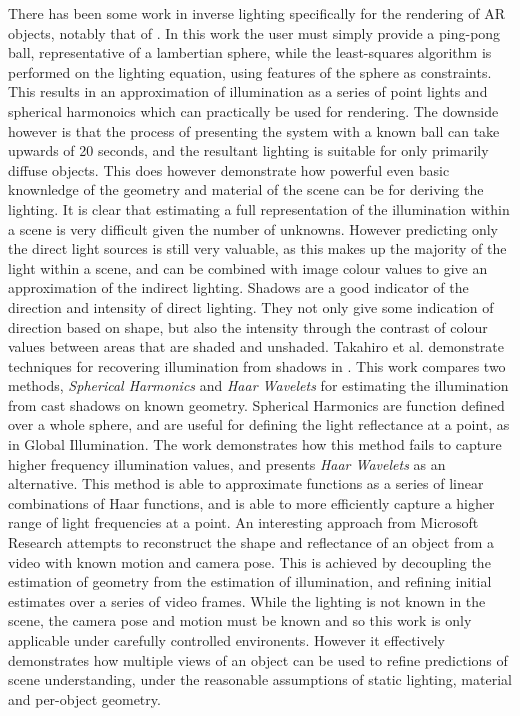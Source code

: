 \documentclass[ %
                    author={Gavin Parker},
                supervisor={Dr. Neill Campbell},
                    degree={MEng},
                     title={Deep Siamese Networks for Illumination Estimation from Stereo Images},
                  subtitle={},
                      type={research},
                      year={2018} ]{dissertation}
\begin{document}
\newline
There has been some work in inverse lighting specifically for the rendering of AR objects, notably that of \cite{Aittala2010}. In this work the user must simply provide a ping-pong ball, representative of a lambertian sphere, while the least-squares algorithm is performed on the lighting equation, using features of the sphere as constraints. This results in an approximation of illumination as a series of point lights and spherical harmonoics which can practically be used for rendering. The downside however is that the process of presenting the system with a known ball can take upwards of 20 seconds, and the resultant lighting is suitable for only primarily diffuse objects. This does however demonstrate how powerful even basic knownledge of the geometry and material of the scene can be for deriving the lighting.
\newline
It is clear that estimating a full representation of the illumination within a scene is very difficult given the number of unknowns. However predicting only the direct light sources is still very valuable, as this makes up the majority of the light within a scene, and can be combined with image colour values to give an approximation of the indirect lighting. Shadows are a good indicator of the direction and intensity of direct lighting. They not only give some indication of direction based on shape, but also the intensity through the contrast of colour values between areas that are shaded and unshaded. Takahiro et al. demonstrate techniques for recovering illumination from shadows in \cite{1315013}. This work compares two methods, \textit{Spherical Harmonics} and \textit{Haar Wavelets} for estimating the illumination from cast shadows on known geometry. Spherical Harmonics are function defined over a whole sphere, and are useful for defining the light reflectance at a point, as in Global Illumination. The work demonstrates how this method fails to capture higher frequency illumination values, and presents \textit{Haar Wavelets} as an alternative. This method is able to approximate functions as a series of linear combinations of Haar functions, and is able to more efficiently capture a higher range of light frequencies at a point. 
\newline
An interesting approach from Microsoft Research \cite{Xia:2016:RSS} attempts to reconstruct the shape and reflectance of an object from a video with known motion and camera pose. This is achieved by decoupling the estimation of geometry from the estimation of illumination, and refining initial estimates over a series of video frames. While the lighting is not known in the scene, the camera pose and motion must be known and so this work is only applicable under carefully controlled environents. However it effectively demonstrates how multiple views of an object can be used to refine predictions of scene understanding, under the reasonable assumptions of static lighting, material and per-object geometry.
\end{document}
